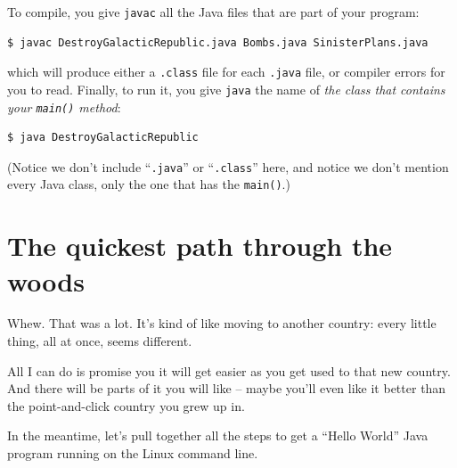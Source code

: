 \begin{enumerate}
To compile, you give \texttt{javac} all the Java files that are part of your
program:

\begin{verbatim}
$ javac DestroyGalacticRepublic.java Bombs.java SinisterPlans.java
\end{verbatim}

which will produce either a \texttt{.class} file for each \texttt{.java} file,
or compiler errors for you to read. Finally, to run it, you give \texttt{java}
the name of \textit{the class that contains your \texttt{main()} method}:

\begin{verbatim}
$ java DestroyGalacticRepublic
\end{verbatim}

(Notice we don't include ``\texttt{.java}'' or ``\texttt{.class}'' here, and
notice we don't mention every Java class, only the one that has the
\texttt{main()}.)

\end{enumerate}

\section{The quickest path through the woods}

Whew. That was a lot. It's kind of like moving to another country: every
little thing, all at once, seems different.

All I can do is promise you it will get easier as you get used to that new
country. And there will be parts of it you will like -- maybe you'll even like
it better than the point-and-click country you grew up in.

In the meantime, let's pull together all the steps to get a ``Hello World''
Java program running on the Linux command line.


